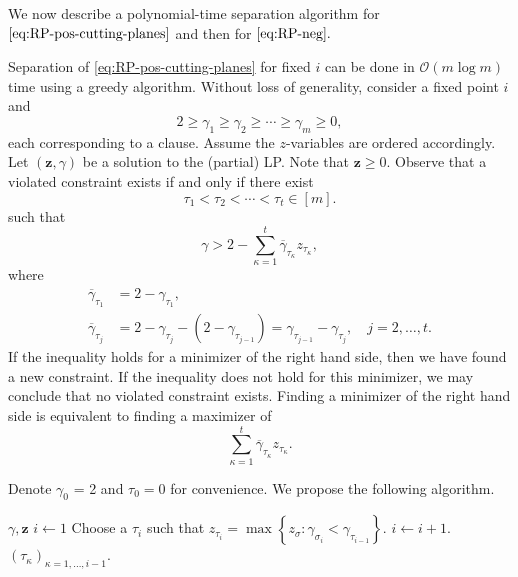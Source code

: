 We now describe a polynomial-time separation algorithm for $\eqref{eq:RP-pos-cutting-planes}$ and then for $\eqref{eq:RP-neg}.$

Separation of \eqref{eq:RP-pos-cutting-planes} for fixed $i$ can be done in $\mathcal{O}(m  \log m)$ time using a greedy algorithm.
Without loss of generality, consider a fixed point $i$ and
\[
    2 \geq \gamma_1 \geq \gamma_2 \geq \cdots \geq \gamma_m \geq 0,
\]
each corresponding to a clause.
Assume the $z$-variables are ordered accordingly.
Let $(\bm{z}, \gamma)$ be a solution to the (partial) LP\@.
Note that $\bm{z} \geq 0$.
Observe that a violated constraint exists if and only if there exist
\[
    \tau_1 < \tau_2 < \cdots < \tau_t \in [m].
\] such that
\begin{equation}\label{eq:violated_pos_cons}
    \gamma > 2 - \sum_{\kappa = 1}^t \overline{\gamma}_{\tau_\kappa}z_{\tau_\kappa},
\end{equation}
where
\begin{align*}
    \overline\gamma_{\tau_1} &= 2 - \gamma_{\tau_1}, \\
    \overline\gamma_{\tau_j} &= 2 - \gamma_{\tau_j} - (2 - \gamma_{\tau_{j-1}}) = \gamma_{\tau_{j-1}} - \gamma_{\tau_j}, \quad j = 2, \dots, t.
\end{align*}
If the inequality holds for a minimizer of the right hand side, then we have found a new constraint.
If the inequality does not hold for this minimizer, we may conclude that no violated constraint exists.
Finding a minimizer of the right hand side is equivalent to finding a maximizer of
\begin{equation}\label{eq:sep-pos-sum}
    \sum_{\kappa = 1}^t \overline{\gamma}_{\tau_\kappa}z_{\tau_\kappa}.
\end{equation}

Denote $\gamma_0$ = 2 and $\tau_0 = 0$ for convenience.
We propose the following algorithm.

\begin{algorithm}[h!]
\caption{Algorithm to find a maximizer of \eqref{eq:sep-pos-sum}}
\label{alg:sep-pos}
\begin{algorithmic}[1]
\Require $\gamma, \bm{z}$
\State $i \gets 1$
    \State Choose a $\tau_i$ such that
    $z_{\tau_i} = \max\left\{z_\sigma : \gamma_{\sigma_i} < \gamma_{\tau_{i-1}}\right\}.$
    \State $i \gets i + 1.$
\EndWhile \\
\Return $(\tau_\kappa)_{\kappa=1,\dots,i-1}.$
\end{algorithmic}
\end{algorithm}


